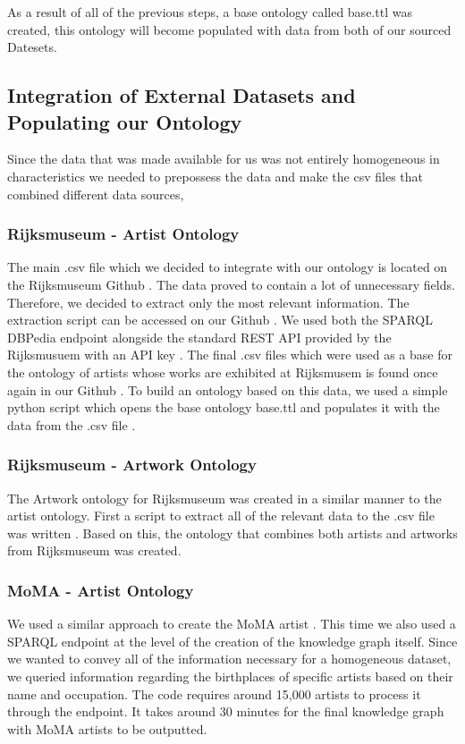 \documentclass{article}
\begin{document}
As a result of all of the previous steps, a base ontology
called base.ttl was created, this ontology will become populated with data from both of our
sourced Datesets.
\subsection{Integration of External Datasets and Populating our Ontology}
Since the data that was made available for us was not entirely homogeneous in characteristics we needed to prepossess the data and make the csv files that combined different data sources,

\subsubsection{Rijksmuseum - Artist Ontology}
The main .csv file which we decided to integrate with our ontology is located on the
Rijksmuseum Github \cite{Third_Github}
. The data proved to contain a lot of unnecessary fields. Therefore, we
decided to extract only the most relevant information. The extraction script can be accessed on our
Github \cite{First_Github}
. We used both the SPARQL DBPedia endpoint alongside the standard REST API
provided by the Rijksmusuem \cite{Rijks_Api}with an API key 
. The final .csv files which were used as a base
for the ontology of artists whose works are exhibited at Rijksmusem is found once again in our
Github \cite{Second_Github}
. To build an ontology based on this data, we used a simple python script which opens
the base ontology base.ttl and populates it with the data from the .csv file \cite{lolGith}.

\subsubsection{ Rijksmuseum - Artwork Ontology}
The Artwork ontology for Rijksmuseum was created in a similar manner to the artist ontology. First a script to
extract all of the relevant data to the .csv file was written \cite{Fourth_Github}. Based
on this, the ontology that combines both artists and artworks from Rijksmuseum was created\cite{lolGith2}. 

\subsubsection{ MoMA - Artist Ontology}
We used a similar approach to create the MoMA artist  \cite{Fith_Github}. This time we also used a
SPARQL endpoint at the level of the creation of the knowledge graph itself. Since we wanted to
convey all of the information necessary for a homogeneous dataset, we queried information
regarding the birthplaces of specific artists based on their name and occupation. The code
requires around 15,000 artists to process it through the endpoint. It takes around 30 minutes for
the final knowledge graph with MoMA artists to be outputted.
\end{document}
